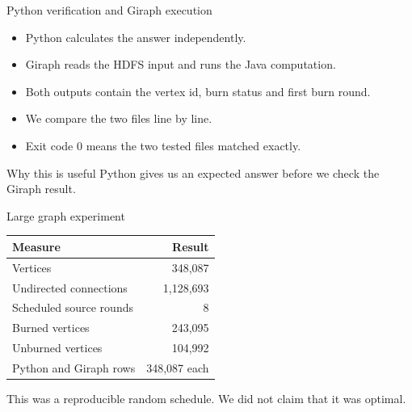 \documentclass[aspectratio=169]{beamer}
\begin{document}
\begin{frame}{Python verification and Giraph execution}
\begin{itemize}
  \item Python calculates the answer independently.
  \item Giraph reads the HDFS input and runs the Java computation.
  \item Both outputs contain the vertex id, burn status and first burn round.
  \item We compare the two files line by line.
  \item Exit code 0 means the two tested files matched exactly.
\end{itemize}

\begin{block}{Why this is useful}
Python gives us an expected answer before we check the Giraph result.
\end{block}
\end{frame}

\begin{frame}{Large graph experiment}
\begin{tabular}{lr}
\toprule
Measure & Result \\
\midrule
Vertices & 348,087 \\
Undirected connections & 1,128,693 \\
Scheduled source rounds & 8 \\
Burned vertices & 243,095 \\
Unburned vertices & 104,992 \\
Python and Giraph rows & 348,087 each \\
\bottomrule
\end{tabular}

\vspace{0.4cm}
This was a reproducible random schedule. We did not claim that it was optimal.
\end{frame}
\end{document}
